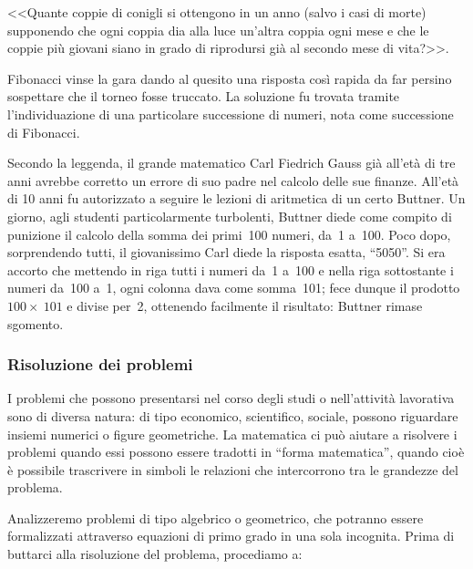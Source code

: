 <<Quante coppie di conigli si ottengono in un anno (salvo i
casi di morte) supponendo che ogni coppia dia alla luce
un'altra coppia ogni mese e che le coppie più
giovani siano in grado di riprodursi già al secondo mese di
vita?>>.

Fibonacci vinse la gara dando al quesito una risposta così rapida da
far persino sospettare che il torneo fosse truccato. La soluzione fu
trovata tramite l'individuazione di una particolare
successione di numeri, nota come successione di Fibonacci.

Secondo la leggenda, il grande matematico Carl Fiedrich Gauss già
all'età di tre anni avrebbe corretto un errore di suo padre nel calcolo
delle sue finanze.
All'età di 10 anni fu autorizzato a seguire le lezioni di aritmetica 
di un certo Buttner. 
Un giorno, agli studenti particolarmente turbolenti, Buttner
diede come compito di punizione il calcolo della somma dei primi~100
numeri, da~1 a~100. Poco dopo, sorprendendo tutti, il giovanissimo Carl
diede la risposta esatta, ``5050''.
Si era accorto che mettendo in riga tutti i numeri da~1 a~100 e nella
riga sottostante i numeri da~100 a~1, ogni colonna dava come somma~101;
fece dunque il prodotto~\(100\times~101\) e divise per~2, ottenendo 
facilmente il risultato: Buttner rimase sgomento.

\subsubsection{Risoluzione dei problemi}


I problemi che possono presentarsi nel corso degli studi o
nell'attività lavorativa sono di diversa natura: di
tipo economico, scientifico, sociale, possono riguardare insiemi
numerici o figure geometriche. La matematica ci può aiutare a
risolvere i problemi quando essi possono essere tradotti in
``forma matematica'', quando cioè è possibile trascrivere in simboli
le relazioni che intercorrono tra le grandezze del problema.

Analizzeremo problemi di tipo algebrico o geometrico, che potranno
essere formalizzati attraverso equazioni di primo grado in una sola
incognita. Prima di buttarci alla risoluzione del problema, procediamo a:


